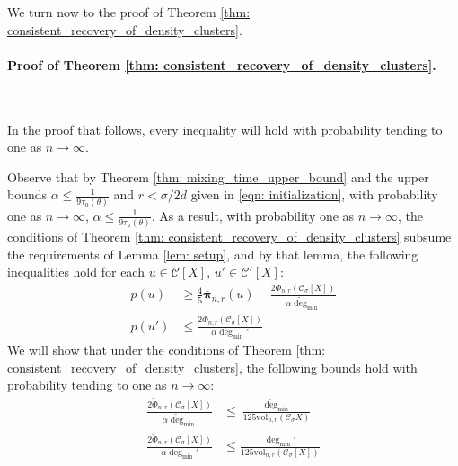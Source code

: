 \documentclass[11pt,twoside]{article}
\newcommand{\vol}{\mathrm{vol}}
\newcommand{\1}{\mathbf{1}}
\newcommand{\pbf}{p}        %
\newcommand{\pibf}{\bm{\pi}}
\newcommand{\Xbf}{X}             %
\newcommand{\Cset}{\mathcal{C}}
\newcommand{\Csig}{\Cset_{\sigma}}
\newcommand{\degminpr}{\deg_{\min}'}
\newcommand{\degminwt}{\widetilde{\deg}_{\min}}
\begin{document}
We turn now to the proof of Theorem \ref{thm: consistent_recovery_of_density_clusters}.

\paragraph{Proof of Theorem \ref{thm: consistent_recovery_of_density_clusters}.}
~

In the proof that follows, every inequality will hold with probability tending to one as $n \to \infty$.

Observe that by Theorem \ref{thm: mixing_time_upper_bound} and the upper bounds $\alpha \leq \frac{1}{9 \tau_{u}(\theta)}$ and $r < \sigma/2d$ given in \eqref{eqn: initialization}, with probability one as $n \to \infty$, $\alpha \leq \frac{1}{9 \tau_{u}(\theta)}$. As a result, with probability one as $n \to \infty$, the conditions of Theorem \ref{thm: consistent_recovery_of_density_clusters} subsume the requirements of Lemma \ref{lem: setup}, and by that lemma, the following inequalities hold for each $u \in \Cset[\Xbf]$, $u' \in \Cset'[\Xbf]$:
\begin{align}
\pbf(u) & \geq \frac{4}{5} \overline{\pibf}_{n,r}(u) - \frac{2 \Phi_{n,r}(\Csig[\Xbf])}{\alpha \degminwt} \nonumber \\
\pbf(u') & \leq \frac{2 \Phi_{n,r}(\Csig[\Xbf])}{\alpha \degminpr} \label{eqn: setup_redux}
\end{align}
We will show that under the conditions of Theorem \ref{thm: consistent_recovery_of_density_clusters}, the following bounds hold with probability tending to one as $n \to \infty$:
\begin{align}
\frac{2\widetilde{\Phi}_{n,r}(\Csig[\Xbf])}{\alpha \degminwt} & \leq \frac{\degminwt}{125 \vol_{n,r}(\Csig{\Xbf})} \nonumber \\
\frac{2\widetilde{\Phi}_{n,r}(\Csig[\Xbf])}{\alpha \degminpr} & \leq \frac{\degminpr}{125 \vol_{n,r}(\Csig[\Xbf])} \label{eqn: gap_bounds}
\end{align}
\end{document}

